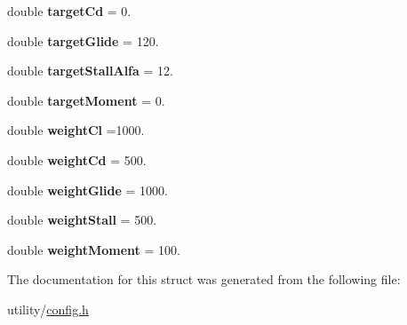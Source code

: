 \begin{DoxyCompactItemize}
double {\bfseries target\+Cd} = 0.
\item 
\mbox{\label{struct_config_1_1_optimizer_params_1_1_fitness_a2c546c543c4b37f14ccb2212f5ccb106}} 
double {\bfseries target\+Glide} = 120.
\item 
\mbox{\label{struct_config_1_1_optimizer_params_1_1_fitness_af9ae034f5b96580c4d6d56885b120472}} 
double {\bfseries target\+Stall\+Alfa} = 12.
\item 
\mbox{\label{struct_config_1_1_optimizer_params_1_1_fitness_aca32b706fb91fd4283e50d2b0bd5c077}} 
double {\bfseries target\+Moment} = 0.
\item 
\mbox{\label{struct_config_1_1_optimizer_params_1_1_fitness_a131f6e3214620d90b03e16be286aad56}} 
double {\bfseries weight\+Cl} =1000.
\item 
\mbox{\label{struct_config_1_1_optimizer_params_1_1_fitness_ad515ada424e92bd3f963fdcd4c63ba03}} 
double {\bfseries weight\+Cd} = 500.
\item 
\mbox{\label{struct_config_1_1_optimizer_params_1_1_fitness_aef5f76da9704838a2caf0c4a9ae712b1}} 
double {\bfseries weight\+Glide} = 1000.
\item 
\mbox{\label{struct_config_1_1_optimizer_params_1_1_fitness_ad9ffb0836c80c0ddcb483c661fc6f42a}} 
double {\bfseries weight\+Stall} = 500.
\item 
\mbox{\label{struct_config_1_1_optimizer_params_1_1_fitness_ae348e127a5fe28e28b8cbe7cb0aea68f}} 
double {\bfseries weight\+Moment} = 100.
\end{DoxyCompactItemize}


The documentation for this struct was generated from the following file\+:\begin{DoxyCompactItemize}
\item 
utility/\hyperlink{config_8h}{config.\+h}\end{DoxyCompactItemize}
